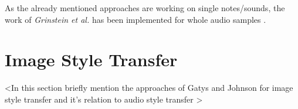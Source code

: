 As the already mentioned approaches are working on single notes/sounds, the work of \textit{Grinstein et al.} has been implemented for whole audio samples \cite{Grinstein2018}. 



\section{Image Style Transfer}
\label{sec:imgstyletransfer}

<In this section briefly mention the approaches of Gatys and Johnson for image style transfer and it's relation to audio style transfer \cite{Gatys2016, johnson2016perceptual}>